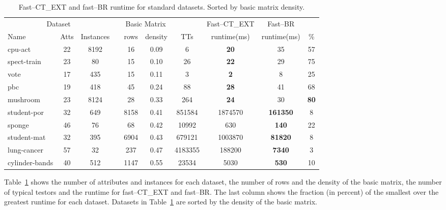\documentclass[citenumber]{llncs}
\begin{document}
	\begin{table}[htb]
		\centering \footnotesize
		\caption{Fast--CT\_EXT and fast--BR runtime for standard datasets. Sorted by basic matrix density.}
		\label{tab:density}
		\begin{tabular}{lccccccccc}
			\hline
			\multicolumn{3}{c}{Dataset}& & \multicolumn{2}{c}{Basic Matrix} &&  \multicolumn{1}{c}{Fast--CT\_EXT} & \multicolumn{1}{c}{Fast--BR} \\
			\cline{1-3}\cline{5-6}
			Name   		     & Atts & Instances & & rows  & density  & TTs    & runtime(ms) & runtime(ms) & \%\\
			\hline
			cpu-act			 & 22   & 8192      & & 16    & 0.09     & 6       & \textbf{20} & 35              & 57 \\
			spect-train      & 23   & 80        & & 15    & 0.10     & 26      & \textbf{22} & 29              & 75 \\
			vote             & 17   & 435       & & 15    & 0.11     & 3       & \textbf{2}  & 8               & 25 \\
			pbc              & 19   & 418       & & 45    & 0.24     & 88      & \textbf{28} & 41              & 68 \\
			mushroom         & 23   & 8124      & & 28    & 0.33     & 264     & \textbf{24} & 30              & \textbf{80} \\
			student-por      & 32   & 649       & & 8158  & 0.41     & 851584  & 1874570     & \textbf{161350} & 8  \\
			sponge           & 46   & 76        & & 68    & 0.42     & 10992   & 630         & \textbf{140}    & 22 \\
			student-mat      & 32   & 395       & & 6904  & 0.43     & 679121  & 1003870     & \textbf{81820}  & 8  \\
			lung-cancer      & 57   & 32        & & 237   & 0.47     & 4183355 & 188200      & \textbf{7340}   & 3  \\
			cylinder-bands   & 40   & 512       & & 1147  & 0.55     & 23534   & 5030        & \textbf{530}    & 10 \\
			\hline
		\end{tabular}
	\end{table}
	
	Table~\ref{tab:density} shows the number of attributes and instances for each dataset, the number of rows and the density of the basic matrix, the number of typical testors and the runtime for fast--CT\_EXT and fast--BR. The last column shows the fraction (in percent) of the smallest over the greatest runtime for each dataset. Datasets in Table~\ref{tab:density} are sorted by the density of the basic matrix. 
	
\end{document}
